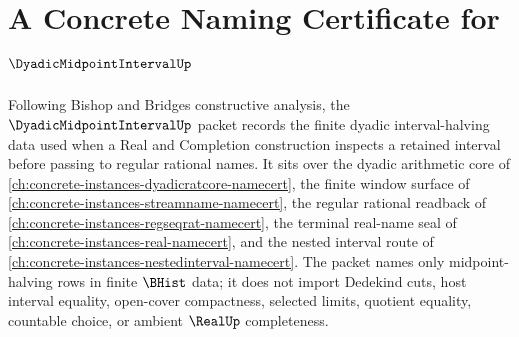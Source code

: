 \chapter{A Concrete Naming Certificate for $\DyadicMidpointIntervalUp$}
\label{ch:concrete-instances-dyadic-midpoint-interval-namecert}

Following Bishop and Bridges constructive analysis, the $\DyadicMidpointIntervalUp$ packet records the finite dyadic interval-halving data used when a Real and Completion construction inspects a retained interval before passing to regular rational names. It sits over the dyadic arithmetic core of \autoref{ch:concrete-instances-dyadicratcore-namecert}, the finite window surface of \autoref{ch:concrete-instances-streamname-namecert}, the regular rational readback of \autoref{ch:concrete-instances-regseqrat-namecert}, the terminal real-name seal of \autoref{ch:concrete-instances-real-namecert}, and the nested interval route of \autoref{ch:concrete-instances-nestedinterval-namecert}. The packet names only midpoint-halving rows in finite $\BHist$ data; it does not import Dedekind cuts, host interval equality, open-cover compactness, selected limits, quotient equality, countable choice, or ambient $\RealUp$ completeness.

